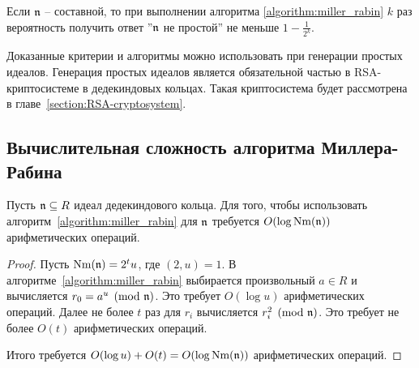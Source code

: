 \documentclass[_00_dissertation.tex]{subfiles}
\begin{document}
\begin{remark}
    Если $\mathfrak{n}$ -- составной, то при выполнении алгоритма \ref{algorithm:miller_rabin} $k$ раз вероятность получить ответ ''$\mathfrak{n}$ не простой'' не меньше $1 - \frac{1}{2^k}$.
\end{remark}

\begin{remark}
    Доказанные критерии и алгоритмы можно использовать при генерации простых идеалов.
    Генерация простых идеалов является обязательной частью в RSA-криптосистеме в дедекиндовых кольцах.
    Такая криптосистема будет рассмотрена в главе~\ref{section:RSA-cryptosystem}.
\end{remark}

\subsection{Вычислительная сложность алгоритма Миллера-Рабина}

\begin{statement}
    Пусть $\mathfrak{n} \subseteq R$ идеал дедекиндового кольца.
    Для того, чтобы использовать алгоритм~\ref{algorithm:miller_rabin} для $\mathfrak{n}$ требуется $O(\log \textrm{Nm}(\mathfrak{n}))$ арифметических операций.
\end{statement}
\begin{proof}
    Пусть $\textrm{Nm}(\mathfrak{n}) = 2^t u$, где $(2, u) = 1$.
    В алгоритме~\ref{algorithm:miller_rabin} выбирается произвольный $a \in R$ и вычисляется $r_0 = a^u \pmod{\mathfrak{n}}$.
    Это требует $O(\log u)$ арифметических операций.
    Далее не более $t$ раз для $r_i$ вычисляется $r_i^2 \pmod{\mathfrak{n}}$.
    Это требует не более $O(t)$ арифметических операций.

    Итого требуется $O(\log u) + O(t) = O(\log \textrm{Nm}(\mathfrak{n}))$ арифметических операций.
\end{proof}



\end{document}

